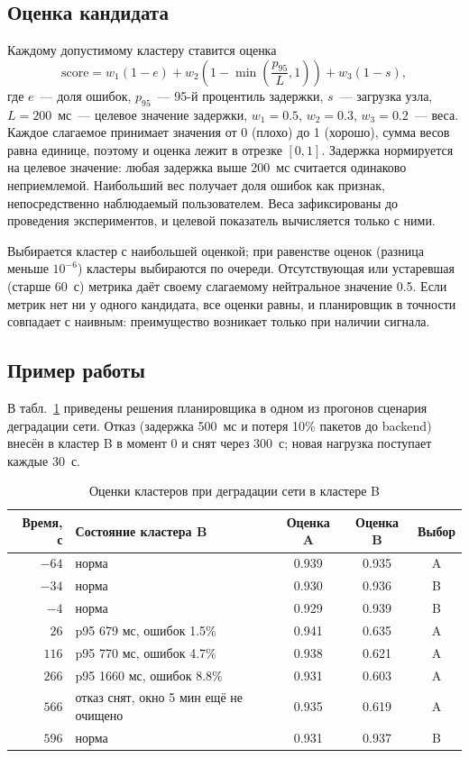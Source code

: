 \subsection{Оценка кандидата}

Каждому допустимому кластеру ставится оценка
\begin{equation}
  \label{eq:score}
  \mathrm{score} = w_1 (1 - e) + w_2 \left(1 - \min\left(\frac{p_{95}}{L}, 1\right)\right)
                 + w_3 (1 - s),
\end{equation}
где $e$~--- доля ошибок, $p_{95}$~--- 95-й процентиль задержки, $s$~---
загрузка узла, $L = 200$~мс~--- целевое значение задержки,
$w_1 = 0.5$, $w_2 = 0.3$, $w_3 = 0.2$~--- веса. Каждое слагаемое принимает
значения от 0 (плохо) до 1 (хорошо), сумма весов равна единице, поэтому и
оценка лежит в отрезке $[0, 1]$. Задержка нормируется на целевое значение:
любая задержка выше 200~мс считается одинаково неприемлемой. Наибольший вес
получает доля ошибок как признак, непосредственно наблюдаемый пользователем.
Веса зафиксированы до проведения экспериментов, и целевой показатель
вычисляется только с ними.

Выбирается кластер с наибольшей оценкой; при равенстве оценок (разница
меньше $10^{-6}$) кластеры выбираются по очереди. Отсутствующая или
устаревшая (старше 60~с) метрика даёт своему слагаемому нейтральное значение
0.5. Если метрик нет ни у одного кандидата, все оценки равны, и планировщик
в точности совпадает с наивным: преимущество возникает только при наличии
сигнала.

\subsection{Пример работы}

В табл.~\ref{tab:scoring-example} приведены решения планировщика в одном из
прогонов сценария деградации сети. Отказ (задержка 500~мс и потеря 10\%
пакетов до backend) внесён в кластер B в момент 0 и снят через 300~с; новая
нагрузка поступает каждые 30~с.

\begin{table}[ht]
  \centering
  \caption{Оценки кластеров при деградации сети в кластере B}
  \label{tab:scoring-example}
  \small
  \begin{tabular}{@{}rlccc@{}}
    \toprule
    Время, с & Состояние кластера B & Оценка A & Оценка B & Выбор \\
    \midrule
    $-64$ & норма & 0.939 & 0.935 & A \\
    $-34$ & норма & 0.930 & 0.936 & B \\
    $-4$  & норма & 0.929 & 0.939 & B \\
    $26$  & p95 679 мс, ошибок 1.5\% & 0.941 & 0.635 & A \\
    $116$ & p95 770 мс, ошибок 4.7\% & 0.938 & 0.621 & A \\
    $266$ & p95 1660 мс, ошибок 8.8\% & 0.931 & 0.603 & A \\
    $566$ & отказ снят, окно 5 мин ещё не очищено & 0.935 & 0.619 & A \\
    $596$ & норма & 0.931 & 0.937 & B \\
    \bottomrule
  \end{tabular}
\end{table}

